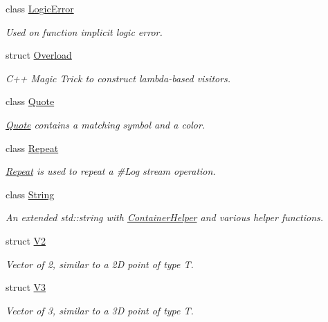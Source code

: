 \begin{DoxyCompactItemize}
class \mbox{\hyperlink{classo_a_1_1_logic_error}{Logic\+Error}}
\begin{DoxyCompactList}\small\item\em Used on function implicit logic error. \end{DoxyCompactList}\item 
struct \mbox{\hyperlink{structo_a_1_1_overload}{Overload}}
\begin{DoxyCompactList}\small\item\em C++ Magic Trick to construct lambda-\/based visitors. \end{DoxyCompactList}\item 
class \mbox{\hyperlink{classo_a_1_1_quote}{Quote}}
\begin{DoxyCompactList}\small\item\em \mbox{\hyperlink{classo_a_1_1_quote}{Quote}} contains a matching symbol and a color. \end{DoxyCompactList}\item 
class \mbox{\hyperlink{classo_a_1_1_repeat}{Repeat}}
\begin{DoxyCompactList}\small\item\em \mbox{\hyperlink{classo_a_1_1_repeat}{Repeat}} is used to repeat a \#\+Log stream operation. \end{DoxyCompactList}\item 
class \mbox{\hyperlink{classo_a_1_1_string}{String}}
\begin{DoxyCompactList}\small\item\em An extended std\+::string with \mbox{\hyperlink{classo_a_1_1_container_helper}{Container\+Helper}} and various helper functions. \end{DoxyCompactList}\item 
struct \mbox{\hyperlink{structo_a_1_1_v2}{V2}}
\begin{DoxyCompactList}\small\item\em Vector of 2, similar to a 2D point of type T. \end{DoxyCompactList}\item 
struct \mbox{\hyperlink{structo_a_1_1_v3}{V3}}
\begin{DoxyCompactList}\small\item\em Vector of 3, similar to a 3D point of type T. \end{DoxyCompactList}\end{DoxyCompactItemize}
